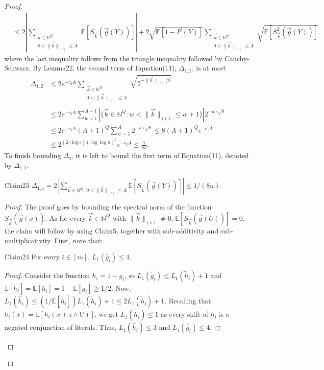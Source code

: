 \begin{proof}
\begin{align}
&\le2\left|\sum_{\substack{\vec k\in\mathbb N^Q\\0<\|\vec k\|_{(c)}\le A}}\mathbb E[S_{\vec k}(\vec g(Y))]\right|
+2\sqrt{\mathbb E[1-I^g(Y)]}\sum_{\substack{\vec k\in\mathbb N^Q\\0<\|\vec k\|_{(c)}\le A}}\sqrt{\mathbb E[S_{\vec k}^2(\vec g(Y))]}.\tag{11}
\end{align}
where the last inequality follows from the triangle inequality followed by Cauchy-Schwarz.
By Lemma22, the second term of Equation(11), $\Delta_{1,2}$, is at most
\begin{align*}
\Delta_{1,2}
&\le2e^{-c_IA}\sum_{\substack{\vec k\in\mathbb N^Q\\0<\|\vec k\|_{(c)}\le A}}\sqrt{2^{-\|\vec k\|_{(c)}/8}}\\
&\le2e^{-c_IA}\sum_{w=1}^{A-1}|\{\vec k\in\mathbb N^Q:w<\|\vec k\|_{(c)}\le w+1\}|2^{-w/\sqrt8}\\
&\le2e^{-c_IA}(A+1)^Q\sum_{w=1}^A2^{-w/\sqrt8}
\le8(A+1)^Qe^{-c_IA}\\
&\le2^{(2/\log c)(\log\log n)^2}e^{-c_IA}\le\frac1{8n}.
\end{align*}
To finish bounding $\Delta_1$, it is left to bound the first term of Equation(11), denoted by $\Delta_{1,1}$.
\begin{authorclaim}{Claim23}
$\Delta_{1,1}=2|\sum_{\vec k\in\mathbb N^Q,\ 0<\|\vec k\|_{(c)}\le A}\mathbb E[S_{\vec k}(\vec g(Y))]|\le1/(8n)$.
\end{authorclaim}
\begin{proof}
The proof goes by bounding the spectral norm of the function $S_{\vec k}(\vec g(x))$. As for every $\vec k\in\mathbb N^Q$ with $\|\vec k\|_{(c)}\ne0$, $\mathbb E[S_{\vec k}(\vec g(U))]=0$, the claim will follow by using Claim5, together with sub-additivity and sub-multiplicativity. First, note that:
\begin{authorclaim}{Claim24}
For every $i\in[m]$, $L_1(\widehat g_i)\le4$.
\end{authorclaim}
\begin{proof}
Consider the function $h_i=1-g_i$, so $L_1(\widetilde g_i)\le L_1(\widetilde h_i)+1$ and $\mathbb E[\widetilde h_i]=\mathbb E[h_i]=1-\mathbb E[g_i]\ge1/2$. Now,
$L_1(\widehat h_i)\le(1/\mathbb E[\widetilde h_i])L_1(\widetilde h_i)+1\le2L_1(\widetilde h_i)+1$. Recalling that $\widetilde h_i(x)=\mathbb E[h_i(x+z\wedge U)]$, we get $L_1(\widetilde h_i)\le1$ as every shift of $h_i$ is a negated conjunction of literals. Thus, $L_1(\widehat h_i)\le3$ and $L_1(\widehat g_i)\le4$.
\end{proof}

\end{proof}
\end{proof}
